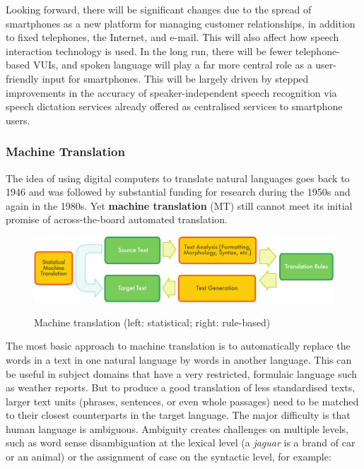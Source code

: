 \begin{multicols}{2}
Looking forward, there will be significant changes due to the spread of smartphones as a new platform for managing customer relationships, in addition to fixed telephones, the Internet, and e-mail.
This will also affect how speech interaction technology is used.
In the long run, there will be fewer telephone-based VUIs, and spoken language will play a far more central role as a user-friendly input for smartphones.
This will be largely driven by stepped improvements in the accuracy of speaker-independent speech recognition via speech dictation services already offered as centralised services to smartphone users. 

\subsubsection{Machine Translation}

The idea of using digital computers to translate natural languages goes back to 1946 and was followed by substantial funding for research during the 1950s and again in the 1980s.  Yet \textbf{machine translation} (MT) still cannot meet its initial promise of across-the-board automated translation.

\begin{figure}[htb]
  \center
  \includegraphics[width=\textwidth]{../_media/english/machine_translation}
  \caption{Machine translation (left: statistical; right: rule-based)}
   \label{fig:mtarch_en}
\end{figure}


The most basic approach to machine translation is to automatically replace the words in a text in one natural language by words in another language.  This can be useful in subject domains that have a very restricted, formulaic language such as weather reports.  But to produce a good translation of less standardised texts, larger text units (phrases, sentences, or even whole passages) need to be matched to their closest counterparts in the target language.  The major difficulty is that human language is ambiguous.  Ambiguity creates challenges on multiple levels, such as word sense disambiguation at the lexical level (a \textit{jaguar} is a brand of car or an animal) or the assignment of case on the syntactic level, for example:


\end{multicols}
